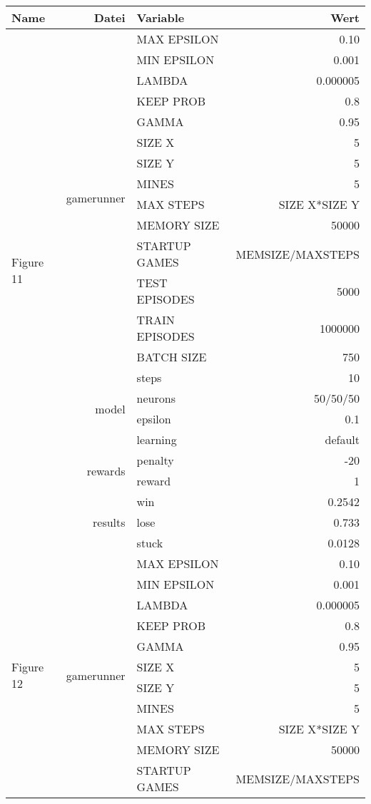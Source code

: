 \documentclass[9pt]{article}
\begin{document}
\begin{tabularx}{\textwidth}{l|r|X|r}
	Name & Datei & Variable & Wert \\
	\hline
	\multirow{21}{*}{Figure 11} & \multirow{14}{*}{gamerunner} & MAX EPSILON	& 0.10\\
	& & MIN EPSILON	& 0.001 \\
	& & LAMBDA & 0.000005 \\
	& & KEEP PROB & 0.8 \\
	& & GAMMA	& 0.95 \\
	& & SIZE X & 5 \\
	& & SIZE Y & 5 \\
	& & MINES & 5 \\
	& & MAX STEPS & SIZE X*SIZE Y\\
	& & MEMORY SIZE & 50000 \\
	& & STARTUP GAMES & MEMSIZE/MAXSTEPS \\
	& & TEST EPISODES & 5000 \\
	& & TRAIN EPISODES & 1000000 \\
	& & BATCH SIZE & 750 \\
	& & steps & 10\\\cline{2-4}
	& \multirow{2}{*}{model} & neurons & 50/50/50 \\ 
	& & epsilon & 0.1\\
	& & learning & default \\\cline{2-4}
	& \multirow{2}{*}{rewards} & penalty & -20\\
	& & reward & 1\\\cline{2-4}
	& \multirow{3}{*}{results} & win & 0.2542\\
	& & lose & 0.733\\
	& & stuck & 0.0128\\
	\hline
	\hline
	\multirow{21}{*}{Figure 12} & \multirow{14}{*}{gamerunner} & MAX EPSILON	& 0.10\\
	& & MIN EPSILON	& 0.001 \\
	& & LAMBDA & 0.000005 \\
	& & KEEP PROB & 0.8 \\
	& & GAMMA	& 0.95 \\
	& & SIZE X & 5 \\
	& & SIZE Y & 5 \\
	& & MINES & 5 \\
	& & MAX STEPS & SIZE X*SIZE Y\\
	& & MEMORY SIZE & 50000 \\
	& & STARTUP GAMES & MEMSIZE/MAXSTEPS \\

\end{tabularx}
\end{document}

